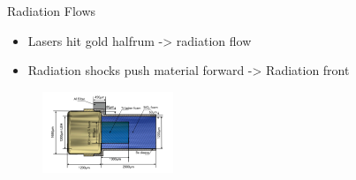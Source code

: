 \documentclass[aspectratio=169,xcolor=dvipsnames]{beamer}
\begin{document}
\begin{frame}{Radiation Flows}
\begin{itemize}
  \item Lasers hit gold halfrum -> radiation flow
  \item Radiation shocks push material forward -> Radiation front
\end{itemize}
 \begin{figure}[h!]
    \centering
    \includegraphics[width=0.35\textwidth]{holfrum.png}
  \end{figure}
\end{frame}
\end{document}
